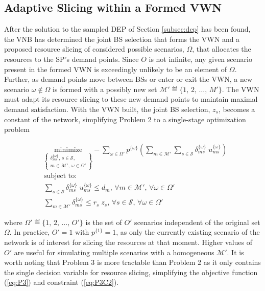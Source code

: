 \documentclass[onecolumn,draftcls]{IEEEtran}
\begin{document}
\subsection{Adaptive Slicing within a Formed VWN} \label{subsec:slice}

After the solution to the sampled DEP of Section \ref{subsec:dep} has been found, the VNB has determined the joint BS selection that forms the VWN and a proposed resource slicing of considered possible scenarios, $\Omega$, that allocates the resources to the SP's demand points.  Since $O$ is not infinite, any given scenario present in the formed VWN is exceedingly unlikely to be an element of $\Omega$.  Further, as demand points move between BSs or enter or exit the VWN, a new scenario $\omega \notin \Omega$ is formed with a possibly new set $\mathcal{M}' \eqdef \{1,\, 2,\, \ldots,\, M'\}$.  The VWN must adapt its resource slicing to these new demand points to maintain maximal demand satisfaction.  With the VWN built, the joint BS selection, $z_s$, becomes a constant of the network, simplifying Problem 2 to a single-stage optimization problem

\vspace{5mm}
\begin{tcolorbox}[title = Problem 3 (Deterministic Adaptive Slicing)]
\begin{align}
& 
\underset{\left\{ \substack{
	\delta_{ms}^{\{\omega\}},\,	s \in \mathcal{S},\\
	m \in \mathcal{M}',\, \omega \in \Omega'} \right\}} {\text{minimize}}
- \sum_{\omega \in \Omega'} p^{\{\omega\}} \left( \sum_{m \in \mathcal{M}'} \sum_{s \in \mathcal{S}} \delta_{ms}^{\{\omega\}} \; u_{ms}^{\{\omega\}} \right) \label{eq:P3}\\
& \text{subject to:}  \nonumber \\
& \sum_{s \in \mathcal{S}} \delta_{ms}^{\{\omega\}} \; u_{ms}^{\{\omega\}} \leq d_m,\, \forall m \in \mathcal{M}',\, \forall \omega \in \Omega' \label{eq:P3C1}\\
& \sum_{m \in \mathcal{M}'} \delta_{ms}^{\{\omega\}} \leq r_s \; z_s,\, \forall s \in \mathcal{S},\, \forall \omega \in \Omega' \label{eq:P3C2}
\end{align}
\end{tcolorbox}

\noindent where $\Omega' \eqdef \{1,\, 2,\, \ldots,\, O'\}$ is the set of $O'$ scenarios independent of the original set $\Omega$.  In practice, $O' = 1$ with $p^{\{1\}} = 1$, as only the currently existing scenario of the network is of interest for slicing the resources at that moment.  Higher values of $O'$ are useful for simulating multiple scenarios with a homogeneous $\mathcal{M}'$.  It is worth noting that Problem 3 is more tractable than Problem 2 as it only contains the single decision variable for resource slicing, simplifying the objective function (\ref{eq:P3}) and constraint (\ref{eq:P3C2}).
\end{document}
